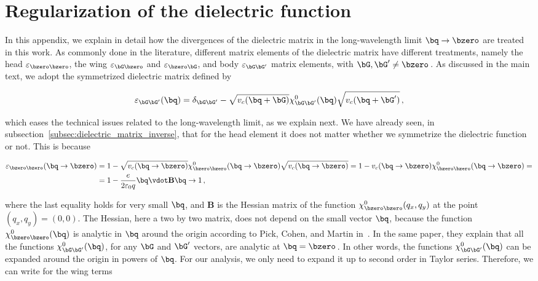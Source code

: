 \section{Regularization of the dielectric function}
\label{app:regularization}

In this appendix, we explain in detail how the divergences of the dielectric matrix in the long-wavelength limit $\bq \to \bzero$ are treated in this work.
As commonly done in the literature, different matrix elements of the dielectric matrix have different treatments, namely the head $\varepsilon_{\bzero \bzero}$, the wing $\varepsilon_{\bG \bzero}$ and $\varepsilon_{\bzero \bG}$, and body $\varepsilon_{\bG\bG'}$ matrix elements, with $\bG,\bG' \neq \bzero$\,.
As discussed in the main text, we adopt the symmetrized dielectric matrix defined by

\begin{equation}
\label{eq:symmetrized_dielectric_matrix}
\varepsilon_{\bG \bG'} (\bq) = \delta_{\bG \bG'} - \sqrt{v_c(\bq + \bG)} \chi^0_{\bG \bG'} (\bq) \sqrt{v_c(\bq + \bG')} \,,
\end{equation}

\noindent which eases the technical issues related to the long-wavelength limit, as we explain next.
We have already seen, in subsection~\ref{subsec:dielectric_matrix_inverse}, that for the head element it does not matter whether we symmetrize the dielectric function or not.
This is because

\begin{align}
    \varepsilon_{\bzero \bzero} (\bq \to \bzero) & =  1 - \sqrt{v_c(\bq \to \bzero)} \chi^0_{\bzero \bzero} (\bq \to \bzero) \sqrt{v_c(\bq \to \bzero)} = 1 - v_c(\bq \to \bzero) \chi^0_{\bzero \bzero} (\bq \to \bzero) = \notag \\
    & = 1 - \frac{e}{2 \varepsilon_0 q} \bq \vdot \mathbf{B} \bq \to 1 \,,
\end{align}

\noindent where the last equality holds for very small $\bq$, and $\mathbf{B}$ is the Hessian matrix of the function $\chi^0_{\bzero \bzero} (q_x,q_y)$ at the point $(q_x,q_y) = (0,0)$.
The Hessian, here a two by two matrix, does not depend on the small vector $\bq$, because the function $\chi^0_{\bzero \bzero} (\bq)$ is analytic in $\bq$ around the origin according to Pick, Cohen, and Martin in~\cite{Pick_Cohen_Martin_1970}.
In the same paper, they explain that all the functions $\chi^0_{\bG \bG'} (\bq)$, for any $\bG$ and $\bG'$ vectors, are analytic at $\bq = \bzero$\,.
In other words, the functions $\chi^0_{\bG \bG'} (\bq)$ can be expanded around the origin in powers of $\bq$.
For our analysis, we only need to expand it up to second order in Taylor series.
Therefore, we can write for the wing terms

